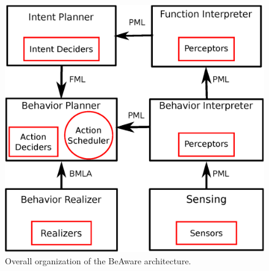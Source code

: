 \begin{figure}
  \centering
  \includegraphics[width=\linewidth]{figure/impl_schema.eps}
  \caption{Overall organization of the BeAware architecture.}
  \label{overall_archi}
\end{figure}

